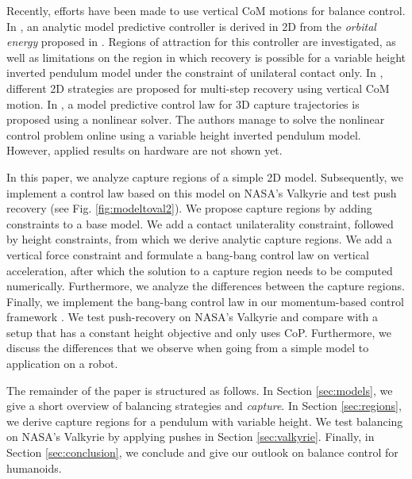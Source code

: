 \documentclass[letterpaper, 10 pt, conference]{ieeeconf}  %
\begin{document}
Recently, efforts have been made to use vertical CoM motions for balance control. In \cite{koolen2016balance}, an analytic model predictive controller is derived in 2D from the \textit{orbital energy} proposed in \cite{pratt2007derivation}. Regions of attraction for this controller are investigated, as well as limitations on the region in which recovery is possible for a variable height inverted pendulum model under the constraint of unilateral contact only. In \cite{gao2017increase}, different 2D strategies are proposed for multi-step recovery using vertical CoM motion. In \cite{caron2018balance}, a model predictive control law for 3D capture trajectories is proposed using a nonlinear solver. The authors manage to solve the nonlinear control problem online using a variable height inverted pendulum model. However, applied results on hardware are not shown yet. %

In this paper, we analyze capture regions of a simple 2D model. Subsequently, we implement a control law based on this model on NASA's Valkyrie and test push recovery (see Fig. \ref{fig:modeltoval2}). We propose capture regions by adding constraints to a base model. We add a contact unilaterality constraint, followed by height constraints, from which we derive analytic capture regions. We add a vertical force constraint and formulate a bang-bang control law on vertical acceleration, after which the solution to a capture region needs to be computed numerically. Furthermore, we analyze the differences between the capture regions. Finally, we implement the bang-bang control law in our momentum-based control framework \cite{koolen2016design}. We test push-recovery on NASA's Valkyrie \cite{radford2015valkyrie} and compare with a setup that has a constant height objective and only uses CoP. Furthermore, we discuss the differences that we observe when going from a simple model to application on a robot.

The remainder of the paper is structured as follows. In Section \ref{sec:models}, we give a short overview of balancing strategies  and \textit{capture}. In Section \ref{sec:regions}, we derive capture regions for a pendulum with variable height. We test balancing on NASA's Valkyrie by applying pushes in Section \ref{sec:valkyrie}. Finally, in Section \ref{sec:conclusion}, we conclude and give our outlook on balance control for humanoids.
\end{document}
